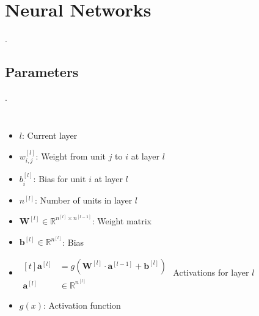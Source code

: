 \documentclass[xcolor={x11names, table}, compress]{beamer}
\newcommand{\insertsec}{\thesection.~\insertsection}
\newcommand{\insertsubsec}{\thesection.\thesubsection~\insertsubsection}
\begin{document}
\section{Neural Networks}
\begin{frame}{\insertsec}
	
\end{frame}
\subsection{Parameters}
\begin{frame}{\insertsubsec}
    \begin{columns}[t]
        \begin{itemize}
            \item $l$: Current layer
            \item $w_{i, j}^{[l]}$: Weight from unit $j$ to $i$ at layer $l$
            \item $b_{i}^{[l]}$: Bias for unit $i$ at layer $l$
            \item $n^{[l]}$: Number of units in layer $l$
            \item $\bm{W}^{[l]} \in \mathbb{R}^{n^{[l]} \times n^{[l - 1]}}$: Weight matrix
            \item $\bm{b}^{[l]} \in \mathbb{R}^{n^{[l]}}$: Bias
            \item $
            \begin{aligned}[t]
            \bm{a}^{[l]} &= g(\bm{W}^{[l]}\cdot \bm{a}^{[l - 1]} + \bm{b}^{[l]}) \\
            \bm{a}^{[l]} &\in \mathbb{R}^{n^{[l]}}
            \end{aligned}
            $ Activations for layer $l$
            \item $g(x)$: Activation function
        \end{itemize}
        \centering
        
    \end{columns}
\end{frame}
\end{document}
